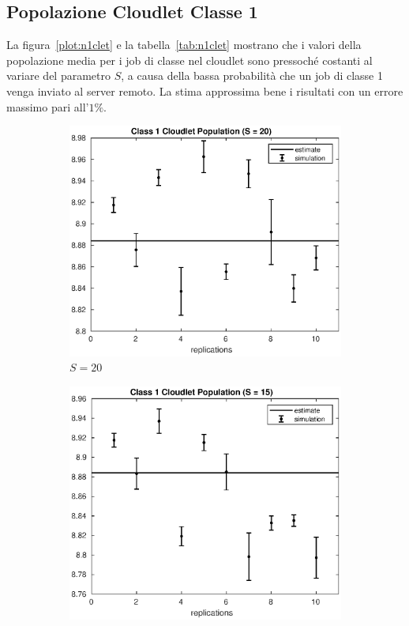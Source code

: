 \subsection{Popolazione Cloudlet Classe 1}
La figura~\ref{plot:n1clet} e la tabella~\ref{tab:n1clet} mostrano che i valori
della popolazione media per i job di classe nel cloudlet sono pressoché costanti
al variare del parametro $S$, a causa della bassa probabilità che un job di
classe 1 venga inviato al server remoto. La stima approssima bene i risultati
con un errore massimo pari all'$1\%$.
\begin{figure}[!h]
\centering
%
\begin{subfigure}[t]{0.49\textwidth}
\includegraphics[width=\textwidth]{figures/simul/20_500K_n1clet}
\caption{$S = 20$}
\label{20_n1clet}
\end{subfigure}
%
\begin{subfigure}[t]{0.49\textwidth}
\includegraphics[width=\textwidth]{figures/simul/15_500K_n1clet}

\end{subfigure}
\end{figure}
